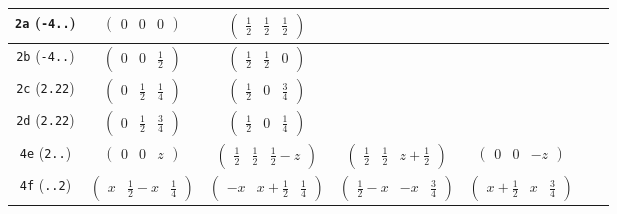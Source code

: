 \documentclass[fleqn,9pt,landscape]{jsarticle}
\begin{document}
\begin{center}
\begin{longtable}{ccccccc}
{\tt 2a} ({\tt -4..}) & $ \begin{pmatrix} 0 & 0 & 0 \end{pmatrix} $ & $ \begin{pmatrix} \frac{1}{2} & \frac{1}{2} & \frac{1}{2} \end{pmatrix} $ & $  $ & $  $ & $  $ & $  $ \\ \hline
{\tt 2b} ({\tt -4..}) & $ \begin{pmatrix} 0 & 0 & \frac{1}{2} \end{pmatrix} $ & $ \begin{pmatrix} \frac{1}{2} & \frac{1}{2} & 0 \end{pmatrix} $ & $  $ & $  $ & $  $ & $  $ \\ \hline
{\tt 2c} ({\tt 2.22}) & $ \begin{pmatrix} 0 & \frac{1}{2} & \frac{1}{4} \end{pmatrix} $ & $ \begin{pmatrix} \frac{1}{2} & 0 & \frac{3}{4} \end{pmatrix} $ & $  $ & $  $ & $  $ & $  $ \\ \hline
{\tt 2d} ({\tt 2.22}) & $ \begin{pmatrix} 0 & \frac{1}{2} & \frac{3}{4} \end{pmatrix} $ & $ \begin{pmatrix} \frac{1}{2} & 0 & \frac{1}{4} \end{pmatrix} $ & $  $ & $  $ & $  $ & $  $ \\ \hline
{\tt 4e} ({\tt 2..}) & $ \begin{pmatrix} 0 & 0 & z \end{pmatrix} $ & $ \begin{pmatrix} \frac{1}{2} & \frac{1}{2} & \frac{1}{2} - z \end{pmatrix} $ & $ \begin{pmatrix} \frac{1}{2} & \frac{1}{2} & z + \frac{1}{2} \end{pmatrix} $ & $ \begin{pmatrix} 0 & 0 & - z \end{pmatrix} $ & $  $ & $  $ \\ \hline
{\tt 4f} ({\tt ..2}) & $ \begin{pmatrix} x & \frac{1}{2} - x & \frac{1}{4} \end{pmatrix} $ & $ \begin{pmatrix} - x & x + \frac{1}{2} & \frac{1}{4} \end{pmatrix} $ & $ \begin{pmatrix} \frac{1}{2} - x & - x & \frac{3}{4} \end{pmatrix} $ & $ \begin{pmatrix} x + \frac{1}{2} & x & \frac{3}{4} \end{pmatrix} $ & $  $ & $  $ \\ \hline

\end{longtable}
\end{center}
\end{document}
